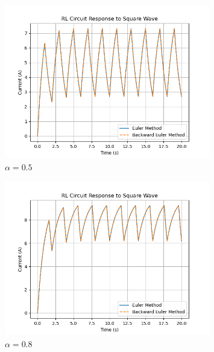 \documentclass{article}
\begin{document}
\begin{figure}[h!] %
  \centering
  \includegraphics[width=0.8\textwidth]{fig(0.5).png}
  \caption{$\alpha = 0.5$}
\end{figure}

\begin{figure}[h!] %
  \centering
  \includegraphics[width=0.8\textwidth]{fig(0.8).png}
  \caption{$\alpha = 0.8$}
\end{figure}
\end{document}
